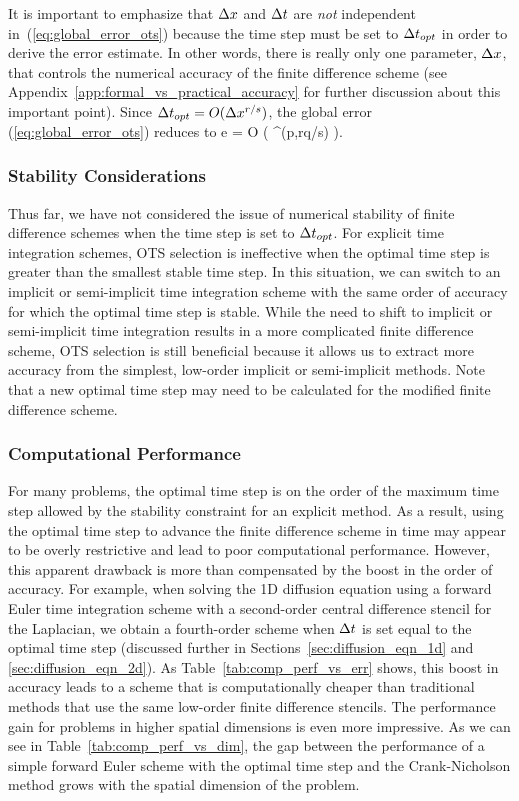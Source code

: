\documentclass[fleqn,12pt,twoside]{article}
\begin{document}
It is important to emphasize that $\Delta x$ and $\Delta t$ are \emph{not} independent 
in~(\ref{eq:global_error_ots}) because the time step must be set to $\Delta t_{opt}$ 
in order to derive the error estimate.  In other words, there is really only 
one parameter, $\Delta x$, that controls the numerical accuracy of the finite 
difference scheme (see Appendix~\ref{app:formal_vs_practical_accuracy} for 
further discussion about this important point).  Since $\Delta t_{opt} = O(\Delta x^{r/s})$, 
the global error (\ref{eq:global_error_ots}) reduces to
\beq
e = O \left( \dx^{\min(p,rq/s)} \right).
\label{eq:global_error_ots_simplified}
\eeq


\subsubsection*{Stability Considerations}
Thus far, we have not considered the issue of numerical stability of finite
difference schemes when the time step is set to $\Delta t_{opt}$.  For explicit time 
integration schemes, OTS selection is ineffective when the optimal time step 
is greater than the smallest stable time step.  In this situation, we can 
switch to an implicit or semi-implicit time integration scheme with the 
same order of accuracy for which the optimal time step is stable.  
While the need to shift to implicit or semi-implicit time integration results 
in a more complicated finite difference scheme, OTS selection is still 
beneficial because it allows us to extract more accuracy from the simplest, 
low-order implicit or semi-implicit methods.
Note that a new optimal time step may need to be calculated for the modified 
finite difference scheme.


\subsubsection*{\label{sec:computational_performance} 
                Computational Performance}
For many problems, the optimal time step is on the order of the maximum 
time step allowed by the stability constraint for an explicit method.  
As a result, using the optimal time step to advance the finite
difference scheme in time may appear to be overly restrictive and lead to poor 
computational performance.  However, this apparent drawback is more than 
compensated by the boost in the order of accuracy.  For example, when solving 
the 1D diffusion equation using a forward Euler time integration scheme with a 
second-order central difference stencil for the Laplacian, we obtain a 
fourth-order scheme when $\Delta t$ is set equal to the optimal time step 
(discussed further in Sections~\ref{sec:diffusion_eqn_1d} and
\ref{sec:diffusion_eqn_2d}).  
As Table~\ref{tab:comp_perf_vs_err} shows, this boost in accuracy leads to a
scheme that is computationally cheaper than traditional methods that use 
the same low-order finite difference stencils.  The performance gain for 
problems in higher spatial dimensions is even more impressive.  As we can see 
in Table~\ref{tab:comp_perf_vs_dim}, the gap between the performance of a
simple forward Euler scheme with the optimal time step and the Crank-Nicholson
method grows with the spatial dimension of the problem.  
\end{document}
